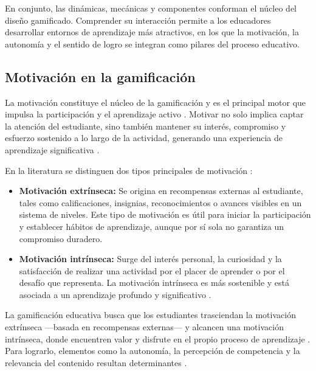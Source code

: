 En conjunto, las dinámicas, mecánicas y componentes conforman el núcleo del diseño gamificado. Comprender su interacción permite a los educadores desarrollar entornos de aprendizaje más atractivos, en los que la motivación, la autonomía y el sentido de logro se integran como pilares del proceso educativo.

\subsection{Motivación en la gamificación}

La motivación constituye el núcleo de la gamificación y es el principal motor que impulsa la participación y el aprendizaje activo \cite{ortiz-colon_gamificacion_2018, jaramillo-mediavilla_impact_2024}.  
Motivar no solo implica captar la atención del estudiante, sino también mantener su interés, compromiso y esfuerzo sostenido a lo largo de la actividad, generando una experiencia de aprendizaje significativa \cite{ortiz-colon_gamificacion_2018}.

En la literatura se distinguen dos tipos principales de motivación \cite{ortiz-colon_gamificacion_2018,morales_elearning_noda, puritat_enhanced_2019}:

\begin{itemize}
	\item \textbf{Motivación extrínseca:} Se origina en recompensas externas al estudiante, tales como calificaciones, insignias, reconocimientos o avances visibles en un sistema de niveles. Este tipo de motivación es útil para iniciar la participación y establecer hábitos de aprendizaje, aunque por sí sola no garantiza un compromiso duradero.  
	\item \textbf{Motivación intrínseca:} Surge del interés personal, la curiosidad y la satisfacción de realizar una actividad por el placer de aprender o por el desafío que representa. La motivación intrínseca es más sostenible y está asociada a un aprendizaje profundo y significativo \cite{ortiz-colon_gamificacion_2018}.  
\end{itemize}

La gamificación educativa busca que los estudiantes trasciendan la motivación extrínseca ---basada en recompensas externas--- y alcancen una motivación intrínseca, donde encuentren valor y disfrute en el propio proceso de aprendizaje \cite{sanchez-pacheco_enfoque_2020}. Para lograrlo, elementos como la autonomía, la percepción de competencia y la relevancia del contenido resultan determinantes \cite{gallego_panoramica_nodate}.

